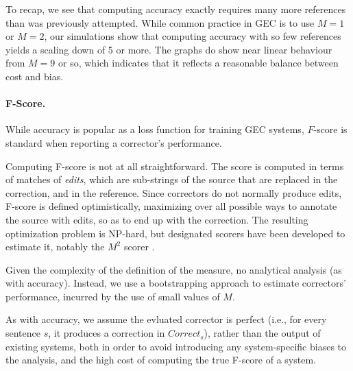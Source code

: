 \documentclass[letter,11pt]{article}
\begin{document}
 To recap, we see that computing accuracy exactly requires many more references than was previously attempted.
 While common practice in GEC is to use $M=1$ or $M=2$, our simulations show that computing accuracy with
 so few references yields a scaling down of 5 or more. The graphs do show near linear behaviour from $M=9$ or
 so, which indicates that it reflects a reasonable balance between cost and bias.
 
 \paragraph{F-Score.}
 While accuracy is popular as a loss function for training GEC systems,
 $F$-score is standard when reporting a corrector's performance.

 Computing F-score is not at all straightforward. The score is computed
 in terms of matches of {\it edits}, which are sub-strings of the source
 that are replaced in the correction, and in the reference. Since correctors
 do not normally produce edits, F-score is defined optimistically, maximizing
 over all possible ways to annotate the source with edits, so as to end
 up with the correction. 
 The resulting optimization problem is NP-hard, but designated scorers
 have been developed to estimate it, notably the $M^2$ scorer
 \cite{dahlmeier2012better}.

 Given the complexity of the definition of the measure, no analytical
 analysis (as with accuracy). Instead, we use a bootstrapping
 approach to estimate correctors' performance,
 incurred by the use of small values of $M$.
 


 As with accuracy, we assume the evluated corrector is perfect 
 (i.e., for every sentence $s$, it produces a correction in $Correct_s$),
 rather than the output of existing systems, both
 in order to avoid introducing any system-specific biases to the analysis,
 and the high cost of computing the true F-score of a system.
\end{document}
